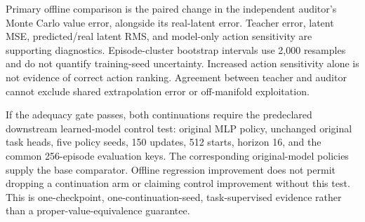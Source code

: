 Primary offline comparison is the paired change in the independent auditor's Monte Carlo value
error, alongside its real-latent error. Teacher error, latent MSE, predicted/real latent RMS, and
model-only action sensitivity are supporting diagnostics. Episode-cluster bootstrap intervals use
2,000 resamples and do not quantify training-seed uncertainty. Increased action sensitivity alone
is not evidence of correct action ranking. Agreement between teacher and auditor cannot exclude
shared extrapolation error or off-manifold exploitation.

If the adequacy gate passes, both continuations require the predeclared downstream learned-model
control test: original MLP policy, unchanged original task heads, five policy seeds, 150 updates,
512 starts, horizon 16, and the common 256-episode evaluation keys. The corresponding original-model
policies supply the base comparator. Offline regression improvement does not permit dropping a
continuation arm or claiming control improvement without this test. This is one-checkpoint,
one-continuation-seed, task-supervised evidence rather than a proper-value-equivalence guarantee.
